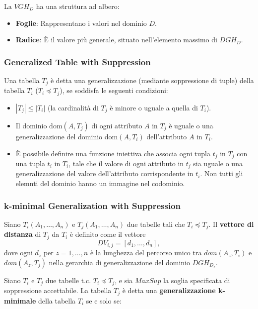 \documentclass{report}
\begin{document}
\noindent La $ VGH_{D} $ ha una struttura ad albero:
\begin{itemize}
    \item \textbf{Foglie}: Rappresentano i valori nel dominio \( D \).
    \item \textbf{Radice}: È il valore più generale, situato nell'elemento massimo di $ DGH_{D} $.
\end{itemize}

\subsubsection{Generalized Table with Suppression}
Una tabella \( T_j \) è detta una generalizzazione (mediante soppressione di tuple) della tabella \( T_i \) (\( T_i \preceq T_j \)), se soddisfa le seguenti condizioni:

\begin{itemize}
    \item \( |T_j| \leq |T_i| \) (la cardinalità di \( T_j \) è minore o uguale a quella di \( T_i \)).
    \item Il dominio \( \text{dom}(A,T_j) \) di ogni attributo \( A \) in \( T_j \) è uguale o una generalizzazione del dominio \( \text{dom}(A,T_i) \) dell'attributo \( A \) in \( T_i \).
    \item È possibile definire una funzione iniettiva che associa ogni tupla \( t_j \) in \( T_j \) con una tupla \( t_i \) in \( T_i \), tale che il valore di ogni attributo in \( t_j \) sia uguale o una generalizzazione del valore dell'attributo corrispondente in \( t_i \). Non tutti gli elemnti del dominio hanno un immagine nel codominio.
\end{itemize}

\subsubsection{k-minimal Generalization with Suppression}
Siano \( T_i(A_1, \ldots, A_n) \) e \( T_j(A_1, \ldots, A_n) \) due tabelle tali che \( T_i \preceq T_j \). Il \textbf{vettore di distanza} di \( T_j \) da \( T_i \) è definito come il vettore
\[
DV_{i,j} = [d_1, \ldots, d_n],
\] 
dove ogni \( d_z \) per \( z = 1, \ldots, n \) è la lunghezza del percorso unico tra \( dom(A_z, T_i) \) e \( dom(A_z, T_j) \) nella gerarchia di generalizzazione del dominio \( DGH_{D_z} \).

\noindent Siano \( T_i \) e \( T_j \) due tabelle t.c. \( T_i \preceq T_j \), e sia \( MaxSup \) la soglia specificata di soppressione accettabile. La tabella \( T_j \) è detta una \textbf{generalizzazione k-minimale} della tabella \( T_i \) se e solo se:
\end{document}
